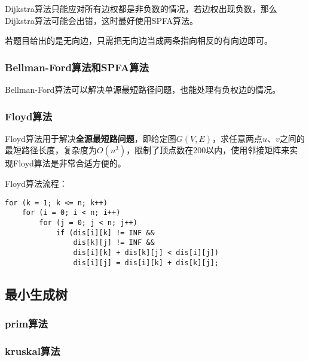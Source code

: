 Dijkstra算法只能应对所有边权都是非负数的情况，若边权出现负数，那么Dijkstra算法可能会出错，这时最好使用SPFA算法。

若题目给出的是无向边，只需把无向边当成两条指向相反的有向边即可。

\subsubsection{Bellman-Ford算法和SPFA算法}

Bellman-Ford算法可以解决单源最短路径问题，也能处理有负权边的情况。


\subsubsection{Floyd算法}

Floyd算法用于解决\textbf{全源最短路问题}，即给定图$G(V,E)$，求任意两点$u$、$v$之间的最短路径长度，复杂度为$O(n^3)$，限制了顶点数在200以内，使用邻接矩阵来实现Floyd算法是非常合适方便的。

Floyd算法流程：

\begin{lstlisting}
for (k = 1; k <= n; k++) 
	for (i = 0; i < n; i++)
		for (j = 0; j < n; j++)
			if (dis[i][k] != INF && 
				dis[k][j] != INF &&
				dis[i][k] + dis[k][j] < dis[i][j])
				dis[i][j] = dis[i][k] + dis[k][j];
\end{lstlisting}

\subsection{最小生成树}

\subsubsection{prim算法}

\subsubsection{kruskal算法}



